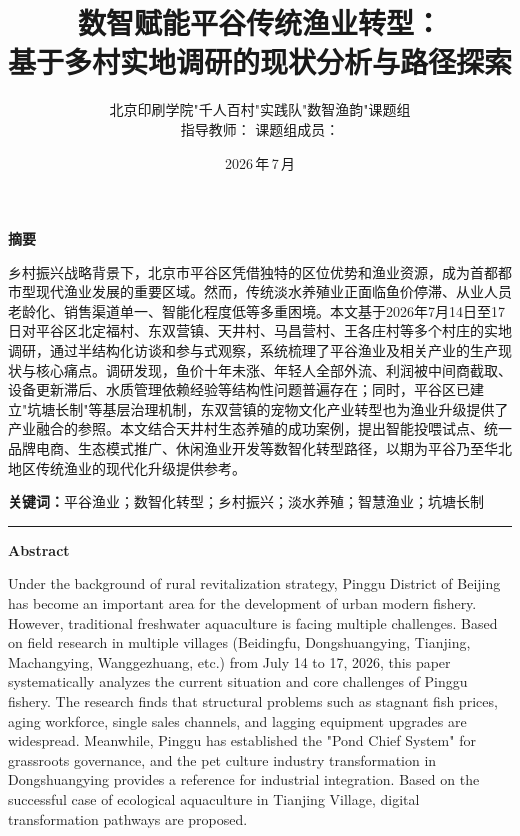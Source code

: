 \documentclass[12pt,a4paper]{article}
\title{
    \vspace{-1cm}
    {\LARGE\bfseries 数智赋能平谷传统渔业转型：\\[6pt] 基于多村实地调研的现状分析与路径探索}
}
\author{
    北京印刷学院\;"千人百村"实践队\;"数智渔韵"课题组 \\[4pt]
    \small 指导教师：\underline{\hspace{3cm}} \qquad
    课题组成员：\underline{\hspace{6cm}}
}
\date{2026\,年\,7\,月}
\begin{document}
\maketitle
\thispagestyle{empty}
\vspace{2cm}
\begin{center}
\textbf{摘\quad 要}
\end{center}
\vspace{0.3cm}

\noindent 乡村振兴战略背景下，北京市平谷区凭借独特的区位优势和渔业资源，成为首都都市型现代渔业发展的重要区域。然而，传统淡水养殖业正面临鱼价停滞、从业人员老龄化、销售渠道单一、智能化程度低等多重困境。本文基于2026年7月14日至17日对平谷区北定福村、东双营镇、天井村、马昌营村、王各庄村等多个村庄的实地调研，通过半结构化访谈和参与式观察，系统梳理了平谷渔业及相关产业的生产现状与核心痛点。调研发现，鱼价十年未涨、年轻人全部外流、利润被中间商截取、设备更新滞后、水质管理依赖经验等结构性问题普遍存在；同时，平谷区已建立"坑塘长制"等基层治理机制，东双营镇的宠物文化产业转型也为渔业升级提供了产业融合的参照。本文结合天井村生态养殖的成功案例，提出智能投喂试点、统一品牌电商、生态模式推广、休闲渔业开发等数智化转型路径，以期为平谷乃至华北地区传统渔业的现代化升级提供参考。

\noindent \textbf{关键词：}平谷渔业；数智化转型；乡村振兴；淡水养殖；智慧渔业；坑塘长制

\vspace{1cm}
\begin{center}
\rule{0.6\textwidth}{0.4pt}
\end{center}
\vspace{0.5cm}

\noindent \textbf{Abstract}

\noindent Under the background of rural revitalization strategy, Pinggu District of Beijing has become an important area for the development of urban modern fishery. However, traditional freshwater aquaculture is facing multiple challenges. Based on field research in multiple villages (Beidingfu, Dongshuangying, Tianjing, Machangying, Wanggezhuang, etc.) from July 14 to 17, 2026, this paper systematically analyzes the current situation and core challenges of Pinggu fishery. The research finds that structural problems such as stagnant fish prices, aging workforce, single sales channels, and lagging equipment upgrades are widespread. Meanwhile, Pinggu has established the "Pond Chief System" for grassroots governance, and the pet culture industry transformation in Dongshuangying provides a reference for industrial integration. Based on the successful case of ecological aquaculture in Tianjing Village, digital transformation pathways are proposed.
\end{document}
